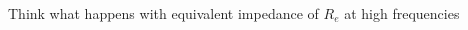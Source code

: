 \documentclass[beamer]{standalone}
\begin{document}
\begin{frame}
\begin{columns}[t]
\begin{column}{.45\textwidth}
\begin{figure}
		\end{figure}
		Think what happens with equivalent impedance of $R_e$ at high
		frequencies
	\end{column}
\end{columns}
\end{frame}
\end{document}
